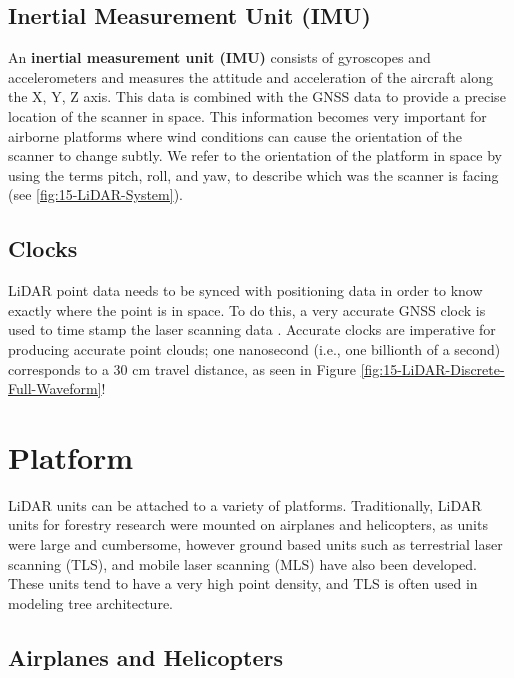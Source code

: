 \documentclass[
]{book}
\begin{document}
\subsection{Inertial Measurement Unit (IMU)}\label{inertial-measurement-unit-imu}

An \textbf{inertial measurement unit (IMU)} consists of gyroscopes and accelerometers and measures the attitude and acceleration of the aircraft along the X, Y, Z axis. This data is combined with the GNSS data to provide a precise location of the scanner in space. This information becomes very important for airborne platforms where wind conditions can cause the orientation of the scanner to change subtly. We refer to the orientation of the platform in space by using the terms pitch, roll, and yaw, to describe which was the scanner is facing (see \ref{fig:15-LiDAR-System}).

\subsection{Clocks}\label{clocks}

LiDAR point data needs to be synced with positioning data in order to know exactly where the point is in space. To do this, a very accurate GNSS clock is used to time stamp the laser scanning data \citep{uf_geomatics_-_fort_lauderdale_lidar_2016-1}. Accurate clocks are imperative for producing accurate point clouds; one nanosecond (i.e., one billionth of a second) corresponds to a 30 cm travel distance, as seen in Figure \ref{fig:15-LiDAR-Discrete-Full-Waveform}!

\section{Platform}\label{platform}

LiDAR units can be attached to a variety of platforms. Traditionally, LiDAR units for forestry research were mounted on airplanes and helicopters, as units were large and cumbersome, however ground based units such as terrestrial laser scanning (TLS), and mobile laser scanning (MLS) have also been developed. These units tend to have a very high point density, and TLS is often used in modeling tree architecture.

\subsection{Airplanes and Helicopters}\label{airplanes-and-helicopters}
\end{document}
